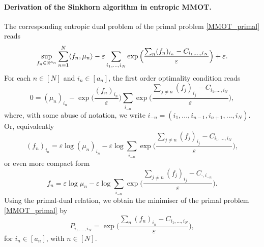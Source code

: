 \paragraph{Derivation of the Sinkhorn algorithm in entropic MMOT.} The corresponding entropic dual problem of the primal problem
\ref{MMOT_primal} reads
\begin{equation}
  \sup_{f_n \in \mathbb R^{a_n}} \sum_{n=1}^N \langle f_n, \mu_n \rangle -
  \varepsilon \sum_{i_1,...,i_N} \exp\Big( \frac{\sum_n (f_n)_{i_n} - C_{i_1,...,i_N}}{\varepsilon} \Big) + \varepsilon.
\end{equation}
For each $n \in [N]$ and $i_n \in [a_n]$, the first order optimality condition reads
\begin{equation}
  0 = (\mu_n)_{i_n} - \exp\big( \frac{(f_n)_{i_n}}{\varepsilon} \big)
  \sum_{i_{-n}} \exp\Big( \frac{\sum_{j \neq n} (f_j)_{i_j} - C_{i_1,...,i_N}}{\varepsilon} \Big),
\end{equation}
where, with some abuse of notation, we write $i_{-n} = (i_1, ..., i_{n-1}, i_{n+1}, ..., i_N)$. Or, equivalently
\begin{equation}
  (f_n)_{i_n} = \varepsilon \log (\mu_n)_{i_n} - \varepsilon \log \sum_{i_{-n}}
  \exp\Big( \frac{\sum_{j \neq n} (f_j)_{i_j} - C_{i_1,...,i_N}}{\varepsilon} \Big),
\end{equation}
or even more compact form
\begin{equation}
  f_n = \varepsilon \log \mu_n - \varepsilon \log \sum_{i_{-n}}
  \exp\Big( \frac{\sum_{j \neq n} (f_j)_{i_j} - C_{\cdot, i_{-n}}}{\varepsilon} \Big).
\end{equation}
Using the primal-dual relation, we obtain the minimiser of the primal problem \ref{MMOT_primal} by
\begin{equation}
  P_{i_1,...,i_N} = \exp\Big( \frac{\sum_n (f_n)_{i_n} - C_{i_1,...,i_N}}{\varepsilon} \Big),
\end{equation}
for $i_n \in [a_n]$, with $n \in [N]$.

